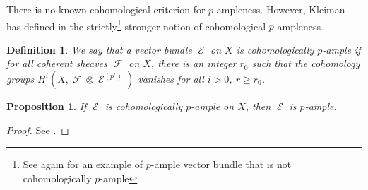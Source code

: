 \documentclass[11pt]{amsart}
\numberwithin{subsection}{section}
\numberwithin{figure}{section}
\numberwithin{table}{section}
\theoremstyle{1}
\newtheorem{proposition}[theorem]{Proposition}
\newtheorem{definition}[theorem]{Definition}
\theoremstyle{2}
\DeclareMathOperator{\Fc}{\mathcal{F}}
\DeclareMathOperator{\E}{\mathcal{E}}
\DeclareMathOperator{\Oc}{\mathcal{O}}
\begin{document}
There is no known cohomological criterion for $p$-ampleness. However, Kleiman has defined in \cite{MR251044} the strictly\footnote{See again \cite{MR296078} for an example of $p$-ample vector bundle that is not cohomologically $p$-ample} stronger notion of cohomological $p$-ampleness. 
\begin{definition}
We say that a vector bundle $\E$ on $X$ is cohomologically $p$-ample if for all coherent sheaves $\Fc$ on $X$, there is an integer $r_0$ such that the cohomology groups $H^i(X,\Fc \otimes \E^{(p^r)})$ vanishes for all $i>0$, $r \geq r_0$.
\end{definition}
\begin{proposition}
If $\E$ is cohomologically $p$-ample on $X$, then $\E$ is $p$-ample.
\end{proposition}
\begin{proof}
See \cite[Proposition 9]{MR251044}.
\end{proof}
\end{document}
